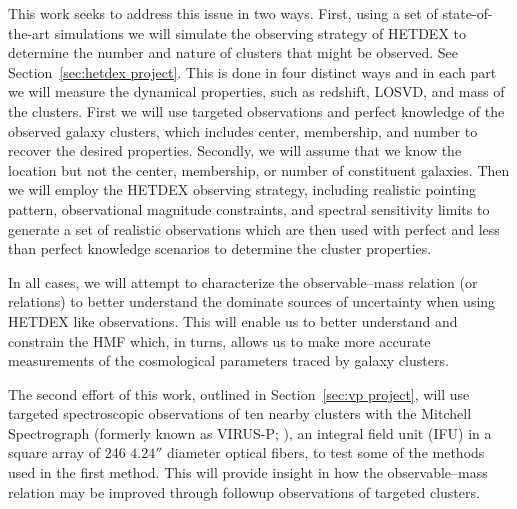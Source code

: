 \documentclass[12pt]{article}
\begin{document}
This work seeks to address this issue in two ways. First, using a set of state-of-the-art simulations we will simulate the observing strategy of HETDEX to determine the number and nature of clusters that might be observed. See Section~\ref{sec:hetdex project}. This is done in four distinct ways and in each part we will measure the dynamical properties, such as redshift, LOSVD, and mass of the clusters. First we will use targeted observations and perfect knowledge of the observed galaxy clusters, which includes center, membership, and number to recover the desired properties. Secondly, we will assume that we know the location but not the center, membership, or number of constituent galaxies. Then we will employ the HETDEX observing strategy, including realistic pointing pattern, observational magnitude constraints, and spectral sensitivity limits to generate a set of realistic observations which are then used with perfect and less than perfect knowledge scenarios to determine the cluster properties. 

In all cases, we will attempt to characterize the observable--mass relation (or relations) to better understand the dominate sources of uncertainty when using HETDEX like observations. This will enable us to better understand and constrain the HMF which, in turns, allows us to make more accurate measurements of the cosmological parameters traced by galaxy clusters.

The second effort of this work, outlined in Section~\ref{sec:vp project}, will use targeted spectroscopic observations of ten nearby clusters with the Mitchell Spectrograph (formerly known as VIRUS-P; \citealt{Hill2008a}), an integral field unit (IFU) in a square array of 246 $4.24''$ diameter optical fibers, to test some of the methods used in the first method. This will provide insight in how the observable--mass relation may be improved through followup observations of targeted clusters.
\end{document}
